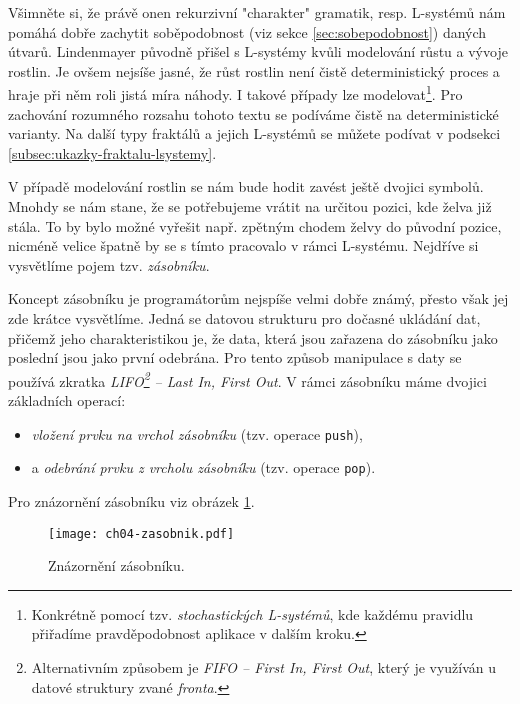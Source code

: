 Všimněte si, že právě onen rekurzivní "charakter" gramatik, resp. L-systémů nám pomáhá dobře zachytit soběpodobnost (viz sekce \ref{sec:sobepodobnost}) daných útvarů. Lindenmayer původně přišel s L-systémy kvůli modelování růstu a vývoje rostlin. Je ovšem nejsíše jasné, že růst rostlin není čistě deterministický proces a hraje při něm roli jistá míra náhody. \cite{Prusinkiewicz1990} I takové případy lze modelovat\footnote{Konkrétně pomocí tzv. \emph{stochastických L-systémů}, kde každému pravidlu přiřadíme pravděpodobnost aplikace v dalším kroku.}. Pro zachování rozumného rozsahu tohoto textu se podíváme čistě na deterministické varianty. Na další typy fraktálů a jejich L-systémů se můžete podívat v podsekci \ref{subsec:ukazky-fraktalu-lsystemy}.

V případě modelování rostlin se nám bude hodit zavést ještě dvojici symbolů. Mnohdy se nám stane, že se potřebujeme vrátit na určitou pozici, kde želva již stála. To by bylo možné vyřešit např. zpětným chodem želvy do původní pozice, nicméně velice špatně by se s tímto pracovalo v rámci L-systému. Nejdříve si vysvětlíme pojem tzv. \emph{zásobníku}.

Koncept zásobníku je programátorům nejspíše velmi dobře známý, přesto však jej zde krátce vysvětlíme. Jedná se datovou strukturu pro dočasné ukládání dat, přičemž jeho charakteristikou je, že data, která jsou zařazena do zásobníku jako poslední jsou jako první odebrána. Pro tento způsob manipulace s daty se používá zkratka \emph{LIFO\footnote{Alternativním způsobem je \emph{FIFO -- First In, First Out}, který je využíván u datové struktury zvané \emph{fronta}.} -- Last In, First Out}. V rámci zásobníku máme dvojici základních operací:
\begin{itemize}
    \item \emph{vložení prvku na vrchol zásobníku} (tzv. operace \texttt{push}), 
    \item a \emph{odebrání prvku z vrcholu zásobníku} (tzv. operace \texttt{pop}).
\end{itemize}
Pro znázornění zásobníku viz obrázek \ref{fig:zasobnik}.
\begin{figure}[h]
    \centering
    \texttt{[image: ch04-zasobnik.pdf]}
    \caption{Znázornění zásobníku.}
    \label{fig:zasobnik}
\end{figure}

